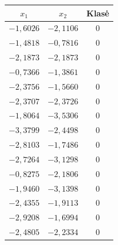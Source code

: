 \begin{minipage}{0.45\textwidth}
    \centering
    \begin{tabular}{|c|c|c|}
        \hline
        $x_1$ & $x_2$ & Klasė \\
        \hline
        $-1{,}6026$ & $-2{,}1106$ & 0 \\ \hline
        $-1{,}4818$ & $-0{,}7816$ & 0 \\ \hline
        $-2{,}1873$ & $-2{,}1873$ & 0 \\ \hline
        $-0{,}7366$ & $-1{,}3861$ & 0 \\ \hline
        $-2{,}3756$ & $-1{,}5660$ & 0 \\ \hline
        $-2{,}3707$ & $-2{,}3726$ & 0 \\ \hline
        $-1{,}8064$ & $-3{,}5306$ & 0 \\ \hline
        $-3{,}3799$ & $-2{,}4498$ & 0 \\ \hline
        $-2{,}8103$ & $-1{,}7486$ & 0 \\ \hline
        $-2{,}7264$ & $-3{,}1298$ & 0 \\ \hline
        $-0{,}8275$ & $-2{,}1806$ & 0 \\ \hline
        $-1{,}9460$ & $-3{,}1398$ & 0 \\ \hline
        $-2{,}4355$ & $-1{,}9113$ & 0 \\ \hline
        $-2{,}9208$ & $-1{,}6994$ & 0 \\ \hline
        $-2{,}4805$ & $-2{,}2334$ & 0 \\ \hline
    \end{tabular}
    \label{tab:klase0}
\end{minipage}